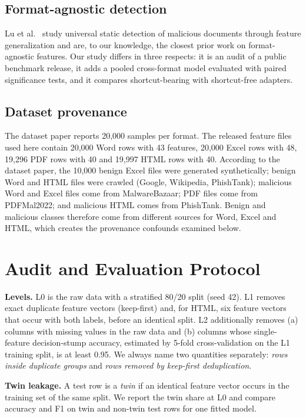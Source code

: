\documentclass[conference]{IEEEtran}
\begin{document}
\subsection{Format-agnostic detection}
Lu et al.\ \cite{lu2021} study universal static detection of malicious documents through feature generalization and are, to our knowledge, the closest prior work on format-agnostic features. Our study differs in three respects: it is an audit of a public benchmark release, it adds a pooled cross-format model evaluated with paired significance tests, and it compares shortcut-bearing with shortcut-free adapters.

\subsection{Dataset provenance}
The dataset paper \cite{nejati2026} reports 20,000 samples per format. The released feature files used here contain 20,000 Word rows with 43 features, 20,000 Excel rows with 48, 19,296 PDF rows with 40 and 19,997 HTML rows with 40. According to the dataset paper, the 10,000 benign Excel files were generated synthetically; benign Word and HTML files were crawled (Google, Wikipedia, PhishTank); malicious Word and Excel files come from MalwareBazaar; PDF files come from PDFMal2022; and malicious HTML comes from PhishTank. Benign and malicious classes therefore come from different sources for Word, Excel and HTML, which creates the provenance confounds examined below.

\section{Audit and Evaluation Protocol}
\textbf{Levels.} L0 is the raw data with a stratified 80/20 split (seed 42). L1 removes exact duplicate feature vectors (keep-first) and, for HTML, six feature vectors that occur with both labels, before an identical split. L2 additionally removes (a) columns with missing values in the raw data and (b) columns whose single-feature decision-stump accuracy, estimated by 5-fold cross-validation on the L1 training split, is at least 0.95. We always name two quantities separately: \emph{rows inside duplicate groups} and \emph{rows removed by keep-first deduplication}.

\textbf{Twin leakage.} A test row is a \emph{twin} if an identical feature vector occurs in the training set of the same split. We report the twin share at L0 and compare accuracy and F1 on twin and non-twin test rows for one fitted model.
\end{document}
